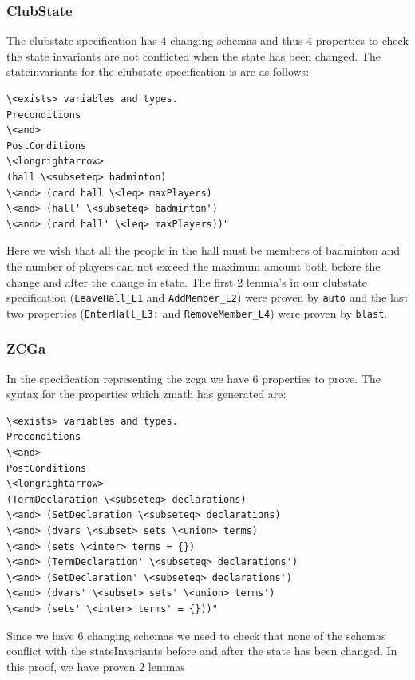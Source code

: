 \subsubsection{ClubState}

The clubstate specification \cite{mathlangexamples} has 4 changing schemas and thus 4 properties to
check the state invariants are not conflicted when the state has been changed.
The stateinvariants for the clubstate specification is are as follows:

\begin{verbatim}
\<exists> variables and types.
Preconditions
\<and>
PostConditions
\<longrightarrow>
(hall \<subseteq> badminton) 
\<and> (card hall \<leq> maxPlayers)
\<and> (hall' \<subseteq> badminton') 
\<and> (card hall' \<leq> maxPlayers))"
\end{verbatim}

Here we wish that all the people in the hall must be members of badminton and
the number of players can not exceed the maximum amount both before the change
and after the change in state. The first 2 lemma's in our clubstate
specification (\verb|LeaveHall_L1| and \verb|AddMember_L2|) were proven by
\verb|auto| and the last two properties (\verb|EnterHall_L3:| and
\verb|RemoveMember_L4|) were proven by \verb|blast|.

\subsubsection{ZCGa}

In the specification \cite{mathlangexamples} representing the \gls{zcga} we have 6 properties to prove.
The syntax for the properties which \gls{zmath} has generated are:

\begin{verbatim}
\<exists> variables and types.
Preconditions
\<and>
PostConditions
\<longrightarrow>
(TermDeclaration \<subseteq> declarations)
\<and> (SetDeclaration \<subseteq> declarations)
\<and> (dvars \<subset> sets \<union> terms)
\<and> (sets \<inter> terms = {})
\<and> (TermDeclaration' \<subseteq> declarations')
\<and> (SetDeclaration' \<subseteq> declarations')
\<and> (dvars' \<subset> sets' \<union> terms')
\<and> (sets' \<inter> terms' = {}))"
\end{verbatim}

Since we have 6 changing schemas we need to check that none of the schemas
conflict with the stateInvariants before and after the state has been changed.
In this proof, we have proven 2 lemmas

